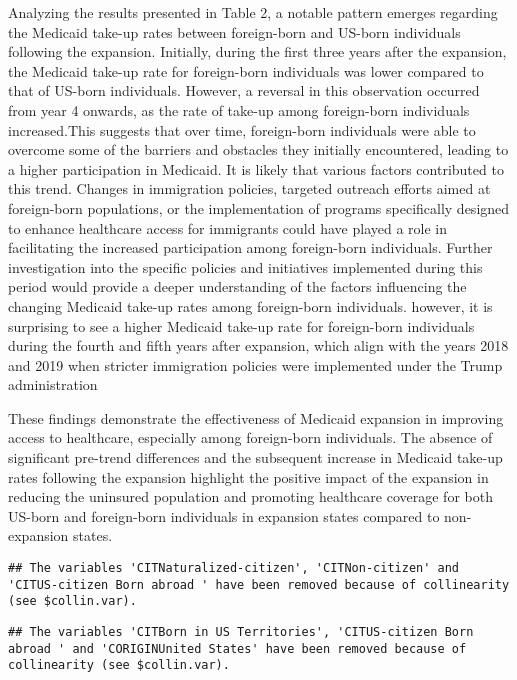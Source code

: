 \documentclass[
]{article}
\begin{document}
Analyzing the results presented in Table 2, a notable pattern emerges
regarding the Medicaid take-up rates between foreign-born and US-born
individuals following the expansion. Initially, during the first three
years after the expansion, the Medicaid take-up rate for foreign-born
individuals was lower compared to that of US-born individuals. However,
a reversal in this observation occurred from year 4 onwards, as the rate
of take-up among foreign-born individuals increased.This suggests that
over time, foreign-born individuals were able to overcome some of the
barriers and obstacles they initially encountered, leading to a higher
participation in Medicaid. It is likely that various factors contributed
to this trend. Changes in immigration policies, targeted outreach
efforts aimed at foreign-born populations, or the implementation of
programs specifically designed to enhance healthcare access for
immigrants could have played a role in facilitating the increased
participation among foreign-born individuals. Further investigation into
the specific policies and initiatives implemented during this period
would provide a deeper understanding of the factors influencing the
changing Medicaid take-up rates among foreign-born individuals. however,
it is surprising to see a higher Medicaid take-up rate for foreign-born
individuals during the fourth and fifth years after expansion, which
align with the years 2018 and 2019 when stricter immigration policies
were implemented under the Trump administration

These findings demonstrate the effectiveness of Medicaid expansion in
improving access to healthcare, especially among foreign-born
individuals. The absence of significant pre-trend differences and the
subsequent increase in Medicaid take-up rates following the expansion
highlight the positive impact of the expansion in reducing the uninsured
population and promoting healthcare coverage for both US-born and
foreign-born individuals in expansion states compared to non-expansion
states.

\begin{verbatim}
## The variables 'CITNaturalized-citizen', 'CITNon-citizen' and 'CITUS-citizen Born abroad ' have been removed because of collinearity (see $collin.var).
\end{verbatim}

\begin{verbatim}
## The variables 'CITBorn in US Territories', 'CITUS-citizen Born abroad ' and 'CORIGINUnited States' have been removed because of collinearity (see $collin.var).
\end{verbatim}
\end{document}
